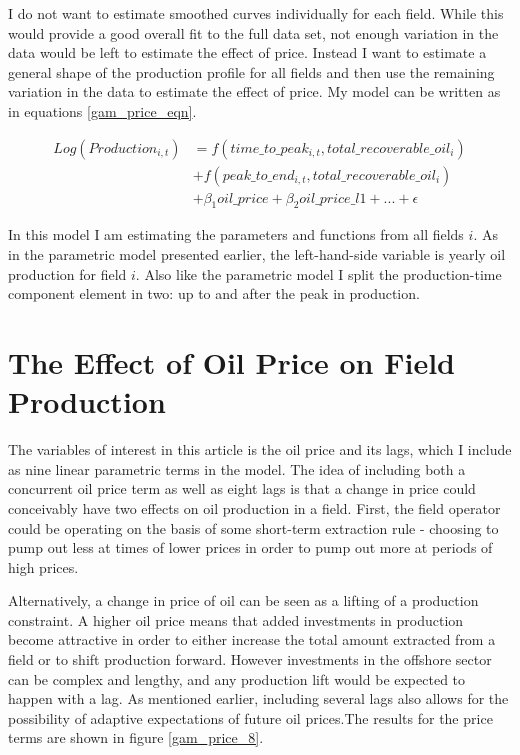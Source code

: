 \documentclass[11pt]{article}
\begin{document}
I do not want to estimate smoothed curves individually for each field.  While this would provide a good overall fit to the full data set, not enough variation in the data would be left to estimate the effect of price.  Instead I want to estimate a general shape of the production profile for all fields and then use the remaining variation in the data to estimate the effect of price.  My model can be written as in equations \ref{gam_price_eqn}.

\begin{equation}
\begin{split}

	Log(Production_{i,t}) & = f(time\_to\_peak_{i,t}, total\_recoverable\_oil_i) \\
 	 \quad & + f(peak\_to\_end_{i,t}, total\_recoverable\_oil_i) \\
	 \quad & + \beta_1 oil\_price + \beta_2 oil\_price\_l1 + ... +  \epsilon
\label{gam_price_eqn}
\end{split}
\end{equation}

In this model I am estimating the parameters and functions from all fields $i$. As in the parametric model presented earlier, the left-hand-side variable is yearly oil production for field $i$. Also like the parametric model I split the production-time component element in two: up to and after the peak in production.

\section{The Effect of Oil Price on Field Production}

The variables of interest in this article is the oil price and its lags, which I include as nine linear parametric terms in the model.  The idea of including both a concurrent oil price term as well as eight lags is that a change in price could conceivably have two effects on oil production in a field.  First, the field operator could be operating on the basis of some short-term extraction rule - choosing to pump out less at times of lower prices in order to pump out more at periods of high prices.  

Alternatively, a change in price of oil can be seen as a lifting of a production constraint.  A higher oil price means that added investments in production become attractive in order to either increase the total amount extracted from a field or to shift production forward.  However investments in the offshore sector can be complex and lengthy, and any production lift would be expected to happen with a lag.  As mentioned earlier, including several lags also allows for the possibility of adaptive expectations of future oil prices.The results for the price terms are shown in figure \ref{gam_price_8}.
\end{document}

